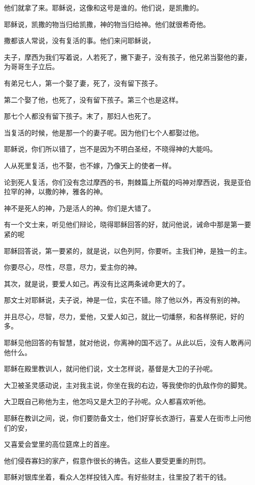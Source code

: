 \documentclass[12pt,oneside]{book}
\begin{document}
他们就拿了来。耶稣说，这像和这号是谁的。他们说，是凯撒的。

耶稣说，凯撒的物当归给凯撒，神的物当归给神。他们就很希奇他。

撒都该人常说，没有复活的事。他们来问耶稣说，

夫子，摩西为我们写着说，人若死了，撇下妻子，没有孩子，他兄弟当娶他的妻，为哥哥生子立后。

有弟兄七人，第一个娶了妻，死了，没有留下孩子。

第二个娶了他，也死了，没有留下孩子。第三个也是这样。

那七个人都没有留下孩子。末了，那妇人也死了。

当复活的时候，他是那一个的妻子呢。因为他们七个人都娶过他。

耶稣说，你们所以错了，岂不是因为不明白圣经，不晓得神的大能吗。

人从死里复活，也不娶，也不嫁，乃像天上的使者一样。

论到死人复活，你们没有念过摩西的书，荆棘篇上所载的吗神对摩西说，我是亚伯拉罕的神，以撒的神，雅各的神。

神不是死人的神，乃是活人的神。你们是大错了。

有一个文士来，听见他们辩论，晓得耶稣回答的好，就问他说，诫命中那是第一要紧的呢

耶稣回答说，第一要紧的，就是说，以色列阿，你要听。主我们神，是独一的主。

你要尽心，尽性，尽意，尽力，爱主你的神。

其次，就是说，要爱人如己。再没有比这两条诫命更大的了。

那文士对耶稣说，夫子说，神是一位，实在不错。除了他以外，再没有别的神。

并且尽心，尽智，尽力，爱他，又爱人如己，就比一切燔祭，和各样祭祀，好的多。

耶稣见他回答的有智慧，就对他说，你离神的国不远了。从此以后，没有人敢再问他什么。

耶稣在殿里教训人，就问他们说，文士怎样说，基督是大卫的子孙呢。

大卫被圣灵感动说，主对我主说，你坐在我的右边，等我使你的仇敌作你的脚凳。

大卫既自己称他为主，他怎吗又是大卫的子孙呢。众人都喜欢听他。

耶稣在教训之间，说，你们要防备文士，他们好穿长衣游行，喜爱人在街市上问他们的安，

又喜爱会堂里的高位筵席上的首座。

他们侵吞寡妇的家产，假意作很长的祷告。这些人要受更重的刑罚。

耶稣对银库坐着，看众人怎样投钱入库。有好些财主，往里投了若干的钱。
\end{document}
